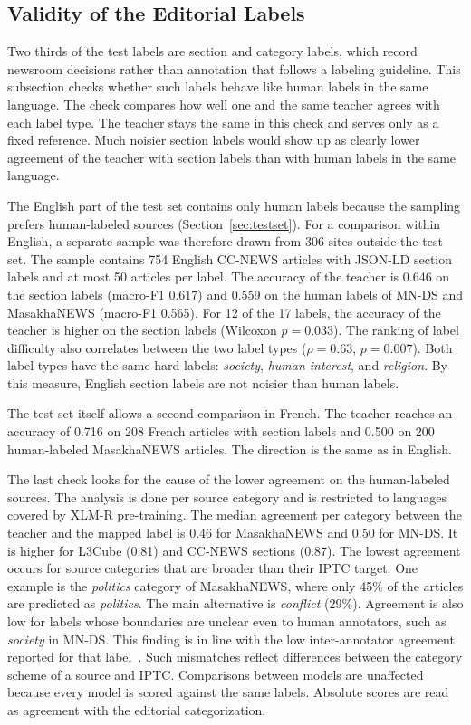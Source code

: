 \documentclass[journal]{IEEEtran}
\begin{document}
\subsection{Validity of the Editorial Labels}
\label{sec:res-validity}
Two thirds of the test labels are section and category labels, which record newsroom decisions rather than annotation that follows a labeling guideline. This subsection checks whether such labels behave like human labels in the same language. The check compares how well one and the same teacher agrees with each label type. The teacher stays the same in this check and serves only as a fixed reference. Much noisier section labels would show up as clearly lower agreement of the teacher with section labels than with human labels in the same language.

The English part of the test set contains only human labels because the sampling prefers human-labeled sources (Section~\ref{sec:testset}). For a comparison within English, a separate sample was therefore drawn from 306 sites outside the test set. The sample contains 754 English CC-NEWS articles with JSON-LD section labels and at most 50 articles per label. The accuracy of the teacher is 0.646 on the section labels (macro-F1 0.617) and 0.559 on the human labels of MN-DS and MasakhaNEWS (macro-F1 0.565). For 12 of the 17 labels, the accuracy of the teacher is higher on the section labels (Wilcoxon $p=0.033$). The ranking of label difficulty also correlates between the two label types ($\rho=0.63$, $p=0.007$). Both label types have the same hard labels: \emph{society}, \emph{human interest}, and \emph{religion}. By this measure, English section labels are not noisier than human labels.

The test set itself allows a second comparison in French. The teacher reaches an accuracy of 0.716 on 208 French articles with section labels and 0.500 on 200 human-labeled MasakhaNEWS articles. The direction is the same as in English.

The last check looks for the cause of the lower agreement on the human-labeled sources. The analysis is done per source category and is restricted to languages covered by XLM-R pre-training. The median agreement per category between the teacher and the mapped label is 0.46 for MasakhaNEWS and 0.50 for MN-DS. It is higher for L3Cube (0.81) and CC-NEWS sections (0.87). The lowest agreement occurs for source categories that are broader than their IPTC target. One example is the \emph{politics} category of MasakhaNEWS, where only 45\% of the articles are predicted as \emph{politics}. The main alternative is \emph{conflict} (29\%). Agreement is also low for labels whose boundaries are unclear even to human annotators, such as \emph{society} in MN-DS. This finding is in line with the low inter-annotator agreement reported for that label~\cite{kuzman2025llm}. Such mismatches reflect differences between the category scheme of a source and IPTC. Comparisons between models are unaffected because every model is scored against the same labels. Absolute scores are read as agreement with the editorial categorization.
\end{document}
